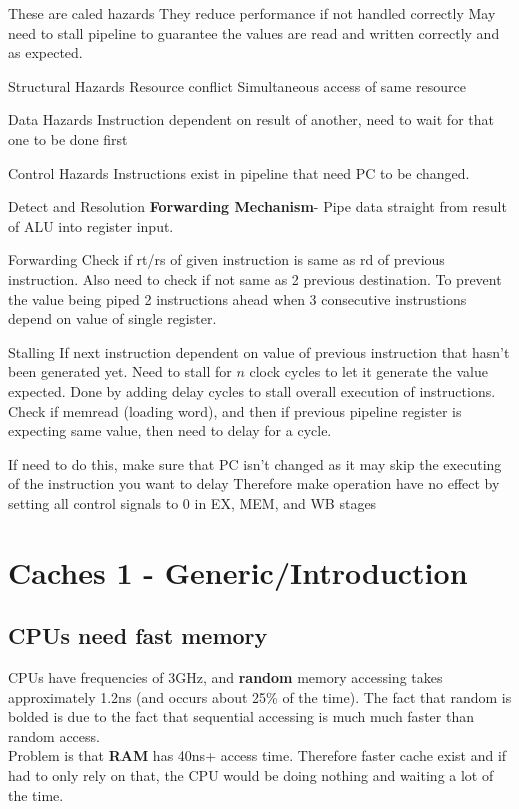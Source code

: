 \documentclass{article}
\begin{document}
		These are caled hazards
		They reduce performance if not handled correctly
		May need to stall pipeline to guarantee the values are read and written correctly and as expected.


		Structural Hazards
			Resource conflict
			Simultaneous access of same resource

		Data Hazards
			Instruction dependent on result of another, need to wait for that one to be done first

		Control Hazards
			Instructions exist in pipeline that need PC to be changed.

		Detect and Resolution
			\textbf{Forwarding Mechanism}- Pipe data straight from result of ALU into register input.

			Forwarding
				Check if rt/rs of given instruction is same as rd of previous instruction.
				Also need to check if not same as 2 previous destination. To prevent the value being piped 2 instructions ahead when 3 consecutive instrustions depend on value of single register.

			Stalling
				If next instruction dependent on value of previous instruction that hasn't been generated yet. 
				Need to stall for $n$ clock cycles to let it generate the value expected. 
				Done by adding delay cycles to stall overall execution of instructions.
				Check if memread (loading word), and then if previous pipeline register is expecting same value, then need to delay for a cycle.

				If need to do this, make sure that PC isn't changed as it may skip the executing of the instruction you want to delay
				Therefore make operation have no effect by setting all control signals to 0 in EX, MEM, and WB stages

				

\section{Caches 1 - Generic/Introduction}
	\subsection*{CPUs need fast memory}
		CPUs have frequencies of 3GHz, and \textbf{random} memory accessing takes approximately 1.2ns (and occurs about 25\% of the time). The fact that random is bolded is due to the fact that sequential accessing is much much faster than random access.\\

		Problem is that \textbf{RAM} has 40ns+ access time. Therefore faster cache exist and if had to only rely on that, the CPU would be doing nothing and waiting a lot of the time.\\
\end{document}

